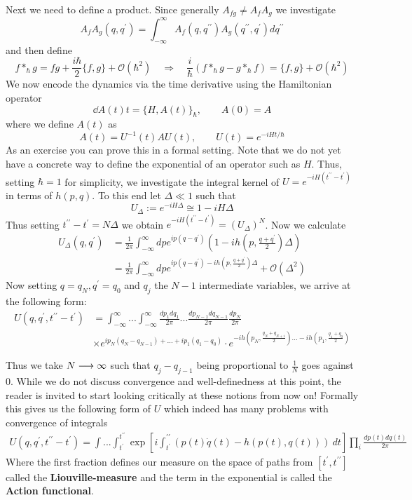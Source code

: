 \begin{example}
  Next we need to define a product. Since generally $A_{fg} \neq A_f A_g$ we investigate
  $$ A_f A_g (q, q^\prime) = \int_{-\infty}^\infty A_f(q, q^{\prime \prime}) A_g(q^{\prime \prime},q^\prime) dq^{\prime \prime} $$
  and then define
  $$ f *_\hbar g = fg + \frac{i\hbar}{2} \{f,g\} + \mathcal{O}(\hbar^2) \quad \Rightarrow \quad \frac{i}{\hbar} (f *_\hbar g - g *_\hbar f) = \{f,g\} + \mathcal{O}(\hbar^2)$$
  We now encode the dynamics via the time derivative using the Hamiltonian operator
  $$ \dd{A(t)}{t} = \{H, A(t)\}_\hbar , \quad \quad A(0) = A $$
  where we define $A(t)$ as
  $$ A(t) = U^{-1}(t) A U(t), \quad \quad U(t) = e^{-i H t / \hbar} $$
  As an exercise you can prove this in a formal setting. Note that we do not yet have a concrete way to define the exponential of an operator such as $H$. Thus, setting $\hbar = 1$ for simplicity, we investigate the integral kernel of $U = e^{-iH(t^{\prime \prime} - t^\prime)}$ in terms of $h(p,q)$. To this end let $\Delta \ll 1$ such that
  $$ U_\Delta := e^{-i H \Delta} \cong 1- i H \Delta $$
  Thus setting $t^{\prime \prime} - t^\prime = N \Delta$ we obtain $e^{-iH(t^{\prime \prime} - t^\prime)} = (U_\Delta)^N$. Now we calculate
  \begin{align*}
    U_\Delta(q,q^\prime) &= \frac{1}{2\pi} \int_{-\infty}^\infty dp e^{ip(q-q^\prime)} \left( 1- i h\left(p, \frac{q+q^\prime}{2} \right) \Delta \right) \\
    &= \frac{1}{2\pi} \int_{-\infty}^\infty dp e^{ip(q-q^\prime) - i h\left(p, \frac{q+q^\prime}{2} \right) \Delta} + \mathcal{O}(\Delta^2)
  \end{align*}
  Now setting $q = q_N, q^\prime = q_0$ and $q_j$ the $N-1$ intermediate variables, we arrive at the following form:
  \begin{align*}
    U(q, q^\prime, t^{\prime\prime}-t^\prime) &= \int_{-\infty}^\infty ... \int_{-\infty}^\infty \frac{dp_1 dq_1}{2\pi} ... \frac{dp_{N-1} dq_{N-1}}{2\pi} \frac{dp_N}{2\pi}\\
    &\times e^{ip_{N}(q_{N}-q_{N-1}) + ... + ip_1(q_1-q_0)} \cdot e^{-ih\left(p_N, \frac{q_N + q_{N+1}}{2}\right) ... -ih\left( p_1, \frac{q_1 + q_0}{2} \right)}
  \end{align*}

  Thus we take $N\longrightarrow \infty$ such that $q_j - q_{j-1}$ being proportional to $\frac{1}{N}$ goes against $0$. While we do not discuss convergence and well-definedness at this point, the reader is invited to start looking critically at these notions from now on! Formally this gives us the following form of $U$ which indeed has many problems with convergence of integrals
  \begin{align*}
    U(q,q^\prime, t^{\prime\prime}-t^\prime) = \int ... \int_{t^\prime}^{t^{\prime\prime}}  \exp\left[i\int_{t^\prime}^{\prime \prime}( p(t)\dot q(t) - h(p(t),q(t)))\ dt \right] \prod_i \frac{dp(t) dq(t)}{2\pi}
  \end{align*}
  Where the first fraction defines our measure on the space of paths from $[t^\prime, t^{\prime\prime}]$ called the \textbf{Liouville-measure} and the term in the exponential is called the \textbf{Action functional}.\\


\end{example}
